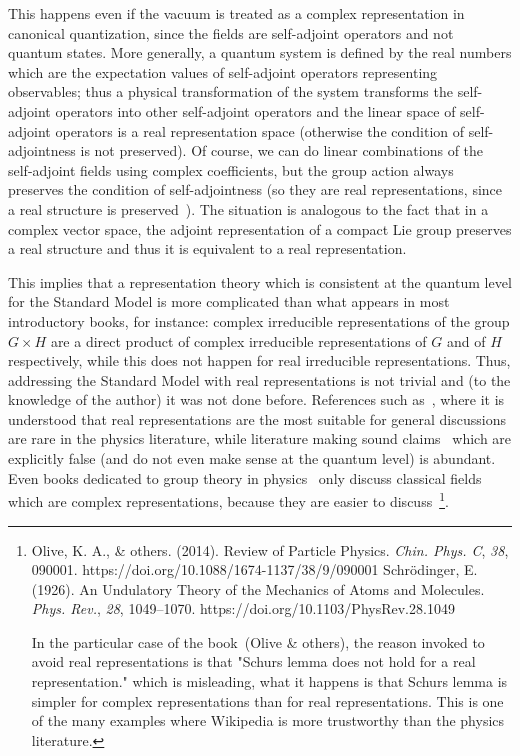 \documentclass[11pt]{book}
\begin{document}
This happens even if the vacuum is treated as a complex representation
in canonical quantization, since the fields are self-adjoint operators
and not quantum states. More generally, a quantum system is defined by
the real numbers which are the expectation values of self-adjoint
operators representing observables; thus a physical transformation of
the system transforms the self-adjoint operators into other self-adjoint
operators and the linear space of self-adjoint operators is a real
representation space (otherwise the condition of self-adjointness is not
preserved). Of course, we can do linear combinations of the self-adjoint
fields using complex coefficients, but the group action always preserves
the condition of self-adjointness (so they are real representations,
since a real structure is
preserved~\cite{Oniux161ux10dik2004Lectures}). The situation is analogous to the fact
that in a complex vector space, the adjoint representation of a compact
Lie group preserves a real structure and thus it is equivalent to a real
representation.

This implies that a representation theory which is consistent at the
quantum level for the Standard Model is more complicated than what
appears in most introductory books, for instance: complex irreducible
representations of the group \(G\times H\) are a direct product of
complex irreducible representations of \(G\) and of \(H\) respectively,
while this does not happen for real irreducible representations. Thus,
addressing the Standard Model with real representations is not trivial
and (to the knowledge of the author) it was not done before. References
such as~\cite{Lee1966Space}\cite{Sartori1991Geometric}\cite{Pilaftsis2012On}\cite{Maas2016Gauge},
where it is understood that real representations are the most suitable
for general discussions are rare in the physics literature, while
literature making sound
claims~\cite{Ratz2017mathcal}
which are explicitly false (and do not even make sense at the quantum
level) is abundant. Even books dedicated to group theory in
physics~\cite{Hayashi2017Group} only
discuss classical fields which are complex representations, because they
are easier to discuss~\footnote{Olive, K. A., \& others. (2014). Review
  of Particle Physics. \emph{Chin. Phys. C}, \emph{38}, 090001.
  https://doi.org/10.1088/1674-1137/38/9/090001 Schrödinger, E. (1926).
  An Undulatory Theory of the Mechanics of Atoms and Molecules.
  \emph{Phys. Rev.}, \emph{28}, 1049--1070.
  https://doi.org/10.1103/PhysRev.28.1049

  In the particular case of the book~(Olive \& others), the reason
  invoked to avoid real representations is that "Schur\textquotesingle s
  lemma does not hold for a real representation." which is misleading,
  what it happens is that Schur\textquotesingle s lemma is simpler for
  complex representations than for real representations. This is one of
  the many examples where Wikipedia is more trustworthy than the physics
  literature.}.
\end{document}
